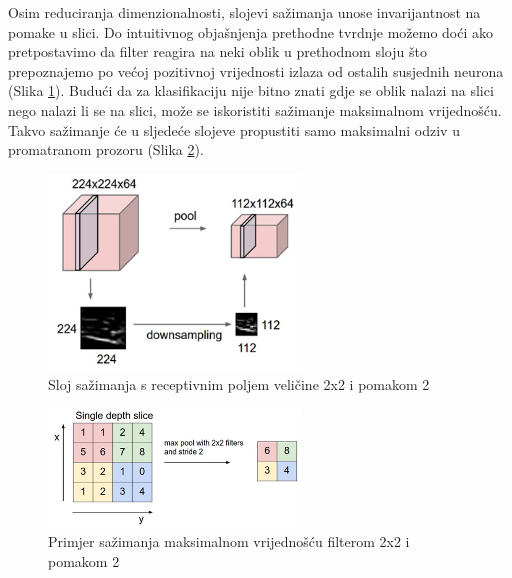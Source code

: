 \documentclass[times, utf8, proizvoljni, numeric]{fer}
\begin{document}
Osim reduciranja dimenzionalnosti, slojevi sažimanja unose invarijantnost na pomake u slici. Do intuitivnog objašnjenja prethodne tvrdnje možemo doći ako pretpostavimo da filter reagira na neki oblik u prethodnom sloju što prepoznajemo po većoj pozitivnoj vrijednosti izlaza od ostalih susjednih neurona (Slika \ref{fg:sazimanje}). Budući da za klasifikaciju nije bitno znati gdje se oblik nalazi na slici nego nalazi li se na slici, može se iskoristiti sažimanje maksimalnom vrijednošću. Takvo sažimanje će u sljedeće slojeve propustiti samo maksimalni odziv u promatranom prozoru (Slika \ref{fg:sazimanje2}).

\begin{figure}[H]
	\begin{center}
		\captionsetup{justification=centering}
		\includegraphics[width=0.6\textwidth]{./imgs/sazimanje.png}
		\caption{Sloj sažimanja s receptivnim poljem veličine 2x2 i pomakom 2 \cite{CS231n}}
		\label{fg:sazimanje}
	\end{center}
\end{figure}


\begin{figure}[H]
	\begin{center}
		\captionsetup{justification=centering}
		\includegraphics[width=0.6\textwidth]{./imgs/sazimanje2.png}
		\caption{Primjer sažimanja maksimalnom vrijednošću filterom 2x2 i pomakom 2 \cite{CS231n}}
		\label{fg:sazimanje2}
	\end{center}
\end{figure}
\end{document}
